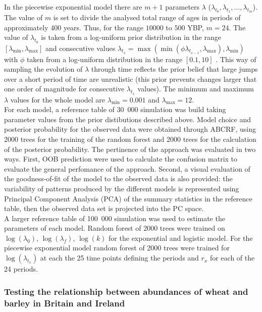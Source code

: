 \documentclass[a4paper]{article}
\begin{document}
In the piecewise exponential model there are $m+1$ parameters $\lambda$ ($\lambda_{t_0},\lambda_{t_1},\dots ,\lambda_{t_{m}}$). The value of $m$ is set to divide the analysed total range of ages in periods of approximately 400 years. Thus, for the range $10000$ to $500$ YBP, $m=24$. The value of $\lambda_{t_0}$ is taken from a log-uniform prior distribution in the range $\left[\lambda_{\min},\lambda_{\max}\right]$ and consecutive values $\lambda_{t_x}=\max(\min(\phi\lambda_{t_{x-1}},\lambda_{\max}),\lambda_{\min})$ with $\phi$ taken from a log-uniform distribution in the range $\left[0.1,10\right]$ \parencite[as in][]{Boitard2016}. This way of sampling the evolution of $\lambda$ through time reflects the prior belief that large jumps over a short period of time are unrealistic (this prior prevents changes larger that one order of magnitude for consecutive $\lambda_{t_x}$ values). The minimum and maximum $\lambda$ values for the whole model are $\lambda_{\min}=0.001$ and $\lambda_{\max}=12$.
\\

For each model, a reference table of 30~000 simulation was build taking parameter values from the prior distibutions described above. Model choice and posterior probability for the observed data were obtained through ABCRF, using 2000 trees for the training of the random forest and 2000 trees for the calculation of the posterior probability. The pertinence of the approach was evaluated in two ways. First, OOB prediction were used to calculate the confusion matrix to evaluate the general perfomance of the approach. Second, a visual evaluation of the goodness-of-fit of the model to the observed data is also provided: the variability of patterns produced by the different models is represented using Principal Component Analysis (PCA) of the summary statistics in the reference table, then the observed data set is projected into the PC space. 
\\

A larger reference table of 100~000 simulation was used to estimate the parameters of each model. Random forest of 2000 trees were trained on $\log(\lambda_0)$, $\log(\lambda_f)$, $\log(k)$ for the exponential and logistic model. For the piecewise exponential model random forest of 2000 trees were trained for $\log(\lambda_{t_x})$ at each the 25 time points defining the periods and $r_x$ for each of the 24 periods.
\\

\subsubsection*{Testing the relationship between abundances of wheat and barley in Britain and Ireland}
\end{document}
